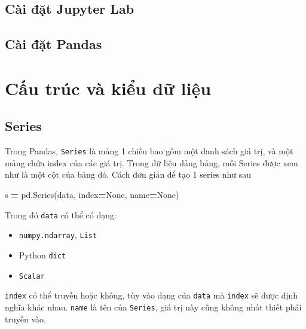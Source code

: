 \documentclass[
]{book}
\newenvironment{Shaded}{\begin{snugshade}}{\end{snugshade}}
\newcommand{\NormalTok}[1]{#1}
\newcommand{\OperatorTok}[1]{\textcolor[rgb]{0.81,0.36,0.00}{\textbf{#1}}}
\newcommand{\VariableTok}[1]{\textcolor[rgb]{0.00,0.00,0.00}{#1}}
\begin{document}
\hypertarget{cuxe0i-ux111ux1eb7t-jupyter-lab}{%
\section*{Cài đặt Jupyter Lab}\label{cuxe0i-ux111ux1eb7t-jupyter-lab}}


\hypertarget{cuxe0i-ux111ux1eb7t-pandas}{%
\section*{Cài đặt Pandas}\label{cuxe0i-ux111ux1eb7t-pandas}}


\hypertarget{cux1ea5u-truxfac-vuxe0-kiux1ec3u-dux1eef-liux1ec7u}{%
\chapter{Cấu trúc và kiểu dữ liệu}\label{cux1ea5u-truxfac-vuxe0-kiux1ec3u-dux1eef-liux1ec7u}}

\hypertarget{series}{%
\section{Series}\label{series}}

Trong Pandas, \texttt{Series} là mảng 1 chiều bao gồm một danh sách giá trị, và một mảng chứa index
của các giá trị. Trong dữ liệu dảng bảng, mỗi Series được xem như là một cột của bảng đó.
Cách đơn giản để tạo 1 series như sau

\begin{Shaded}
\begin{Highlighting}[]
\NormalTok{s }\OperatorTok{=}\NormalTok{ pd.Series(data, index}\OperatorTok{=}\VariableTok{None}\NormalTok{, name}\OperatorTok{=}\VariableTok{None}\NormalTok{)}
\end{Highlighting}
\end{Shaded}

Trong đó \texttt{data} có thể có dạng:

\begin{itemize}
\item
  \texttt{numpy.ndarray}, \texttt{List}
\item
  Python \texttt{dict}
\item
  \texttt{Scalar}
\end{itemize}

\texttt{index} có thể truyền hoặc không, tùy vào dạng của \texttt{data} mà \texttt{index} sẽ được định nghĩa khác nhau.
\texttt{name} là tên của \texttt{Series}, giá trị này cũng không nhất thiết phải truyền vào.
\end{document}
